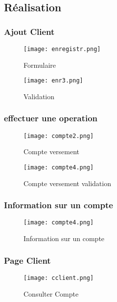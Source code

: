 \documentclass[../rapportdestage.tex]{subfiles}
\begin{document}
	
	
	
	
		
		\subsection{Réalisation}
		
		\subsubsection{Ajout Client}
	\begin{figure}[bh]
\centering
\texttt{[image: enregistr.png]} 
 \label{fig:Formulaire }
\caption{Formulaire }
\texttt{[image: enr3.png]} 
 
\label{fig:Validation}
\caption{Validation }
\end{figure}
		
\clearpage
\newpage		


\subsubsection{effectuer une operation}


\begin{figure}[bh]
\centering
\texttt{[image: compte2.png]} 
 
\label{fig:Compte versement }
\caption{Compte versement}
\vspace{2cm}
\texttt{[image: compte4.png]} 
 
\label{fig:Compte versement validation}
\caption{Compte versement validation}

\end{figure}
\clearpage
\newpage


\subsubsection{Information sur un compte}

\begin{figure}[bh]
\centering
\texttt{[image: compte4.png]} 
 
\label{fig:Information sur un compte }
\caption{Information sur un compte}
\end{figure}




\subsubsection{Page Client}


\begin{figure}[bh]
\centering
\texttt{[image: cclient.png]} 
 
\label{fig:Consuter son Compte }
\caption{Consulter Compte}
\end{figure}
\clearpage
\newpage
 
 
 
 
\end{document}
